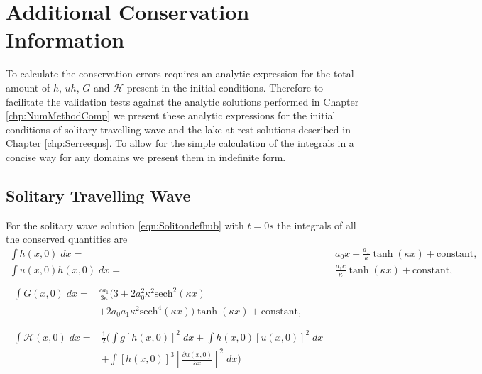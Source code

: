 \chapter{Additional Conservation Information}
\label{app:ConQuant}
To calculate the conservation errors requires an analytic expression for the total amount of $h$, $uh$, $G$ and $\mathcal{H}$ present in the initial conditions. Therefore to facilitate the validation tests against the analytic solutions performed in Chapter \ref{chp:NumMethodComp} we present these analytic expressions for the initial conditions of solitary travelling wave and the lake at rest solutions described in Chapter \ref{chp:Serreeqns}. To allow for the simple calculation of the integrals in a concise way for any domains we present them in indefinite form. 

\section{Solitary Travelling Wave}
For the solitary wave solution \eqref{eqn:Solitondefhub} with $t=0s$ the integrals of all the conserved quantities are
\allowdisplaybreaks
\begin{subequations}
	\begin{align}
	\int h(x,0) \; dx = {} & a_0 x + \frac{a_1}{\kappa} \tanh\left(\kappa x\right) + \text{constant}, \label{eqn:SolitonConservationh} \\
	\int u(x,0)h(x,0) \;  dx = {} & \frac{a_1 c}{\kappa} \tanh\left(\kappa x\right)+ \text{constant}, \label{eqn:SolitonConservationuh} \\  \nonumber \\
	\begin{split}
	\int G(x,0) \; dx = {}&  \frac{c a_1}{3 \kappa}  \Bigg(3 + 2a_0^2 \kappa^2\text{sech}^2\left(\kappa x\right)  \\ &+ 2a_0 a_1 \kappa^2 \text{sech}^4\left(\kappa x\right) \Bigg)\tanh\left(\kappa x\right)  + \text{constant} ,
	\end{split} \label{eqn:SolitonConservationG}
	\\  \nonumber \\
	\begin{split}
	\int \mathcal{H}(x,0) \; dx = {}&\frac{1}{2} \Bigg(\int g\left[h(x,0)\right]^2 \; dx + \int h(x,0)\left[u(x,0)\right]^2 \; dx  \\ &+ \int \left[h(x,0)\right]^3 \left[\frac{\partial u(x,0)}{\partial x}\right]^2 \; dx \Bigg) \label{eqn:SolitonConservationH}
	\end{split}
	\end{align}
	\label{eqn:SolitonConservation}
\end{subequations}

